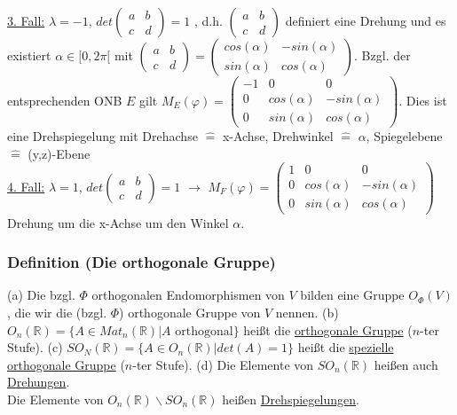 \documentclass[a4paper]{article}
\newcommand{\ul}{\underline}
\let\phi\varphi
\begin{document}
\ul{3. Fall:} \(\lambda=-1\), \(det\begin{pmatrix}
a & b\\
c & d
\end{pmatrix}=1\) , d.h. \(\begin{pmatrix}
a & b\\
c & d
\end{pmatrix}\) definiert eine Drehung und es existiert \(\alpha\in[0,2\pi[\) mit \(\begin{pmatrix}
a & b\\
c & d
\end{pmatrix}=\begin{pmatrix}
cos(\alpha) & -sin(\alpha)\\
sin(\alpha) & cos(\alpha)
\end{pmatrix}\). Bzgl. der entsprechenden ONB \(E\) gilt \(M_E(\phi)=\begin{pmatrix}
-1 & 0 & 0\\
0 & cos(\alpha) & -sin(\alpha)\\
0 & sin(\alpha) & cos(\alpha)
\end{pmatrix}\). Dies ist eine Drehspiegelung mit Drehachse \(\hat{=}\) x-Achse, Drehwinkel \(\hat{=}\) \(\alpha\), Spiegelebene \(\hat{=}\) (y,z)-Ebene\\
\ul{4. Fall:} \(\lambda=1\), \(det\begin{pmatrix}
a & b\\
c & d
\end{pmatrix}=1\) \(\rightarrow\) \(M_F(\phi)=\begin{pmatrix}
1 & 0 & 0\\
0 & cos(\alpha) & -sin(\alpha)\\
0 & sin(\alpha) & cos(\alpha)
\end{pmatrix}\) Drehung um die x-Achse um den Winkel \(\alpha\).
\subsubsection{Definition (Die orthogonale Gruppe)}
(a) Die bzgl. \(\Phi\) orthogonalen Endomorphismen von \(V\) bilden eine Gruppe \(O_\Phi(V)\), die wir die (bzgl. \(\Phi\)) orthogonale Gruppe von \(V\) nennen.
(b) \(O_n(\mathbb{R})=\{A\in Mat_n(\mathbb{R})|A\text{ orthogonal}\}\) heißt die \ul{orthogonale Gruppe} (\(n\)-ter Stufe).
(c) \(SO_N(\mathbb{R})=\{A\in O_n(\mathbb{R})|det(A)=1\}\) heißt die \ul{spezielle orthogonale Gruppe} (\(n\)-ter Stufe).
(d) Die Elemente von \(SO_n(\mathbb{R})\) heißen auch \ul{Drehungen}.\\
Die Elemente von \(O_n(\mathbb{R})\backslash SO_n(\mathbb{R})\) heißen \ul{Drehspiegelungen}.
\end{document}
